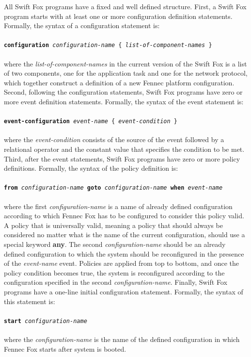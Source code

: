 All Swift Fox programs have a fixed and well defined structure. First, a
Swift Fox program starts with at least one or more configuration definition
statements. Formally, the syntax of a configuration statement is:	\\
\\
\texttt{\textbf{configuration} \textit{configuration-name} 
  \{ \textit{list-of-component-names} \} }	 			\\
\\
where the \textit{list-of-component-names} in the current version of the
Swift Fox is a list of two components, one for the application task and one
for the network protocol, which together construct a definition of a new
Fennec platform configuration. Second, following the configuration
statements, Swift Fox programs have zero or more event definition
statements. Formally, the syntax of the event statement is:		\\
\\
\texttt{\textbf{event-configuration} \textit{event-name} 
  \{ \textit{event-condition} \} }					\\
\\
where the \textit{event-condition} consists of the source of the event
followed by a relational operator and the constant value that specifies the
condition to be met. Third, after the event statements, Swift Fox programs 
have zero or more policy definitions. Formally, the syntax of the policy
definition is:								\\
\\
\texttt{\textbf{from} \textit{configuration-name} \textbf{goto} 
  \textit{configuration-name} \textbf{when} \textit{event-name} }	\\
\\
where the first \textit{configuration-name} is a name of already defined
configuration according to which Fennec Fox has to be configured to
consider this policy valid. A policy that is universally valid, meaning a
policy that should always be considered no matter what is the name of the
current configuration, should use a special keyword \textbf{any}. The
second \textit{configuration-name} should be an already defined
configuration to which the system should be reconfigured in the presence of
the \textit{event-name} event. Policies are applied from top to bottom, and
once the policy condition becomes true, the system is reconfigured
according to the configuration specified in the second
\textit{configuration-name}. Finally, Swift Fox programs have a one-line
initial configuration statement. Formally, the syntax of this statement is:\\
\\
\texttt{\textbf{start} \textit{configuration-name} }			\\
\\
where the \textit{configuration-name} is the name of the defined
configuration in which Fennec Fox starts after system is booted.


